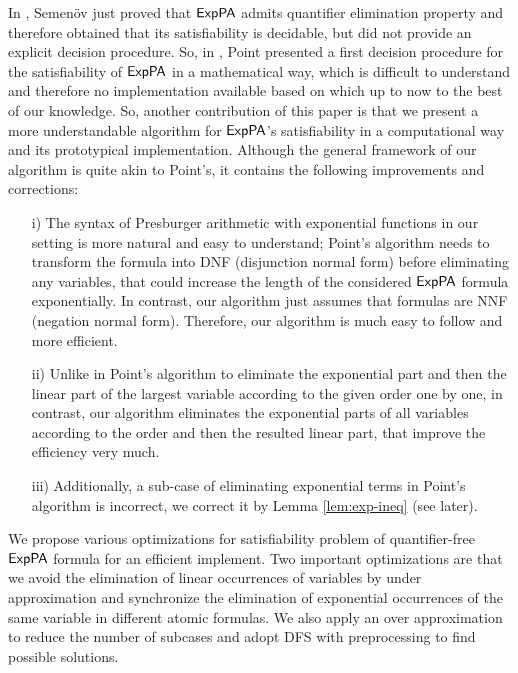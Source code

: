 In \cite{Semenov84}, Semen\"{o}v just proved that ${\sf ExpPA}$ admits quantifier elimination property and 
therefore obtained that its satisfiability is decidable, but  did not provide an explicit decision procedure. So, in  \cite{Point86}, Point presented a first decision procedure for the satisfiability of ${\sf ExpPA}$ in a mathematical way, which is difficult to understand and therefore no implementation available based on which up to now to the best of our knowledge. So, another contribution of this paper is that we present a more understandable algorithm for ${\sf ExpPA}$'s satisfiability in a computational way and its prototypical implementation. Although the general framework of our algorithm is quite akin to Point's,  it contains the following improvements and corrections: 
\begin{itemize}
	\item[i)] The syntax of Presburger arithmetic with exponential functions in our setting is more natural and easy to understand; Point's algorithm needs to transform the formula into DNF (disjunction normal form) before  eliminating any variables, that could increase the length of the considered ${\sf ExpPA}$ formula exponentially. In contrast, our algorithm just assumes that formulas are NNF (negation normal form). Therefore, our algorithm is much easy to follow and more efficient.
\item[ii)] Unlike in Point's algorithm to eliminate the exponential part and then the linear part of the largest variable according to the given order one by one, in contrast, our algorithm eliminates the exponential parts of 
	all variables according to the order and then the resulted linear part, that improve the efficiency very much.
\item[iii)] Additionally, a sub-case of eliminating exponential terms in Point's algorithm is incorrect, we correct it by Lemma \ref{lem:exp-ineq} (see later).
\end{itemize}
 
We propose various optimizations for satisfiability problem of quantifier-free ${\sf ExpPA}$ formula for an efficient implement. Two important optimizations are that we avoid the elimination of linear occurrences of variables by under approximation and synchronize the elimination of exponential occurrences of the same variable in different atomic formulas. We also apply an over approximation to reduce the number of subcases and adopt DFS with preprocessing to find possible solutions. 

